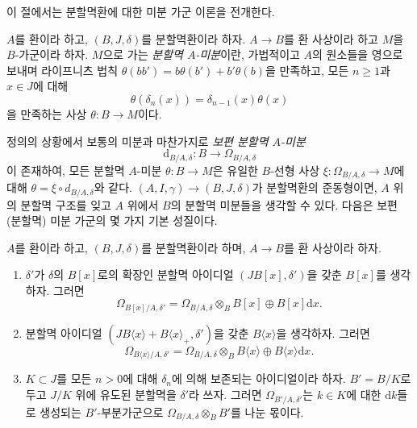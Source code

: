 \noindent
이 절에서는 분할멱환에 대한 미분 가군 이론을 전개한다.

\begin{definition}
\label{definition-derivation}
$A$를 환이라 하고, $(B, J, \delta)$를 분할멱환이라 하자.
$A \to B$를 환 사상이라 하고 $M$을 $B$-가군이라 하자.
$M$으로 가는 {\it 분할멱 $A$-미분}이란, 가법적이고 $A$의 원소들을
영으로 보내며 라이프니츠 법칙
$\theta(bb') = b\theta(b') + b'\theta(b)$을 만족하고, 모든
$n \geq 1$과 $x \in J$에 대해
$$
\theta(\delta_n(x)) = \delta_{n - 1}(x)\theta(x)
$$
을 만족하는 사상 $\theta : B \to M$이다.
\end{definition}

\noindent
정의의 상황에서 보통의 미분과 마찬가지로
{\it 보편 분할멱 $A$-미분}
$$
\text{d}_{B/A, \delta} : B \to \Omega_{B/A, \delta}
$$
이 존재하여, 모든 분할멱 $A$-미분 $\theta : B \to M$은 유일한
$B$-선형 사상 $\xi : \Omega_{B/A, \delta} \to M$에 대해
$\theta = \xi \circ d_{B/A, \delta}$와 같다.
$(A, I, \gamma) \to (B, J, \delta)$가 분할멱환의 준동형이면,
$A$ 위의 분할멱 구조를 잊고 $A$ 위에서 $B$의 분할멱 미분들을
생각할 수 있다. 다음은 보편 (분할멱) 미분 가군의 몇 가지
기본 성질이다.

\begin{lemma}
\label{lemma-omega}
$A$를 환이라 하고, $(B, J, \delta)$를 분할멱환이라 하며,
$A \to B$를 환 사상이라 하자.
\begin{enumerate}
\item $\delta'$가 $\delta$의 $B[x]$로의 확장인 분할멱 아이디얼
$(JB[x], \delta')$을 갖춘 $B[x]$를 생각하자. 그러면
$$
\Omega_{B[x]/A, \delta'} =
\Omega_{B/A, \delta} \otimes_B B[x] \oplus B[x]\text{d}x.
$$
\item 분할멱 아이디얼
$(JB\langle x \rangle + B\langle x \rangle_{+}, \delta')$을 갖춘
$B\langle x \rangle$을 생각하자. 그러면
$$
\Omega_{B\langle x\rangle/A, \delta'} =
\Omega_{B/A, \delta} \otimes_B B\langle x \rangle \oplus
B\langle x\rangle \text{d}x.
$$
\item $K \subset J$를 모든 $n > 0$에 대해 $\delta_n$에 의해
보존되는 아이디얼이라 하자. $B' = B/K$로 두고 $J/K$ 위에
유도된 분할멱을 $\delta'$라 쓰자. 그러면
$\Omega_{B'/A, \delta'}$는 $k \in K$에 대한 $\text{d}k$들로
생성되는 $B'$-부분가군으로 $\Omega_{B/A, \delta} \otimes_B B'$를
나눈 몫이다.
\end{enumerate}
\end{lemma}

